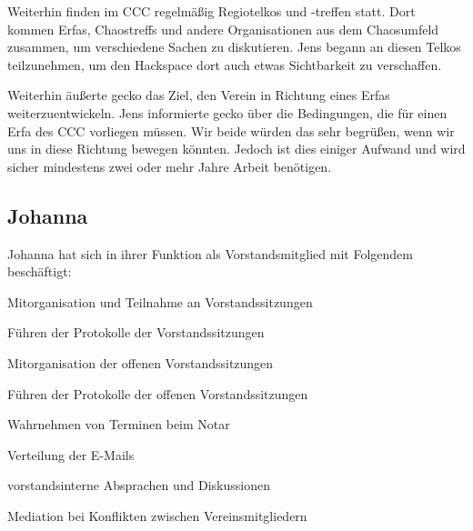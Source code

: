 \documentclass[ngerman]{scrartcl}
\begin{document}
Weiterhin finden im CCC regelmäßig Regiotelkos und -treffen statt. Dort kommen
Erfas, Chaostreffs und andere Organisationen aus dem Chaosumfeld zusammen, um
verschiedene Sachen zu diskutieren. Jens begann an diesen Telkos teilzunehmen,
um den Hackspace dort auch etwas Sichtbarkeit zu verschaffen.

Weiterhin äußerte gecko das Ziel, den Verein in Richtung eines Erfas
weiterzuentwickeln. Jens informierte gecko über die Bedingungen, die für einen
Erfa des CCC vorliegen müssen. Wir beide würden das sehr begrüßen, wenn wir uns
in diese Richtung bewegen könnten. Jedoch ist dies einiger Aufwand und wird
sicher mindestens zwei oder mehr Jahre Arbeit benötigen.

\subsection{Johanna}

Johanna hat sich in ihrer Funktion als Vorstandsmitglied mit Folgendem 
beschäftigt:

\begin{compactitem}
    \item Mitorganisation und Teilnahme an Vorstandssitzungen
    \item Führen der Protokolle der Vorstandssitzungen
    \item Mitorganisation der offenen Vorstandssitzungen
    \item Führen der Protokolle der offenen Vorstandssitzungen
    \item Wahrnehmen von Terminen beim Notar
    \item Verteilung der E-Mails
    \item vorstandsinterne Absprachen und Diskussionen 
    \item Mediation bei Konflikten zwischen Vereinsmitgliedern
\end{compactitem}
\end{document}
